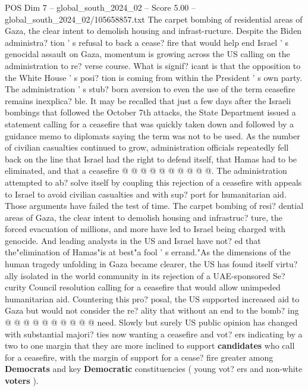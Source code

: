 \begin{textsample}{POS Dim 7 – global\_south\_2024\_02 – Score 5.00 – global\_south\_2024\_02/105658857.txt}  \label{ex:f7_pos_202}
The carpet bombing of residential areas of Gaza, the clear intent to demolish housing and infrast-ructure.
Despite the Biden administra? tion ' s refusal to back a cease? fire that would help end Israel ' s genocidal assault on Gaza, momentum is growing across the US calling on the administration to re? verse course.
What is signif? icant is that the opposition to the White House ' s posi? tion is coming from within the President ' s own party.
The administration ' s stub? born aversion to even the use of the term ceasefire remains inexplica? ble.
It may be recalled that just a few days after the Israeli bombings that followed the October 7th attacks, the State Department issued a statement calling for a ceasefire that was quickly taken down and followed by a guidance memo to diplomats saying the term was not to be used.
As the number of civilian casualties continued to grow, administration officials repeatedly fell back on the line that Israel had the right to defend itself, that Hamas had to be eliminated, and that a ceasefire @ @ @ @ @ @ @ @ @ @.
The administration attempted to ab? solve itself by coupling this rejection of a ceasefire with appeals to Israel to avoid civilian casualties and with sup? port for humanitarian aid.
Those arguments have failed the test of time.
The carpet bombing of resi? dential areas of Gaza, the clear intent to demolish housing and infrastruc? ture, the forced evacuation of millions, and more have led to Israel being charged with genocide.
And leading analysts in the US and Israel have not? ed that the"elimination of Hamas"is at best"a fool ' s errand."As the dimensions of the human tragedy unfolding in Gaza became clearer, the US has found itself virtu? ally isolated in the world community in its rejection of a UAE-sponsored Se? curity Council resolution calling for a ceasefire that would allow unimpeded humanitarian aid.
Countering this pro? posal, the US supported increased aid to Gaza but would not consider the re? ality that without an end to the bomb? ing @ @ @ @ @ @ @ @ @ @ need.
Slowly but surely US public opinion has changed with substantial majori? ties now wanting a ceasefire and vot? ers indicating by a two to one margin that they are more inclined to support \textbf{candidates} who call for a ceasefire, with the margin of support for a cease? fire greater among \textbf{Democrats} and key \textbf{Democratic} constituencies ( young vot? ers and non-white \textbf{voters} ).

\end{textsample}
